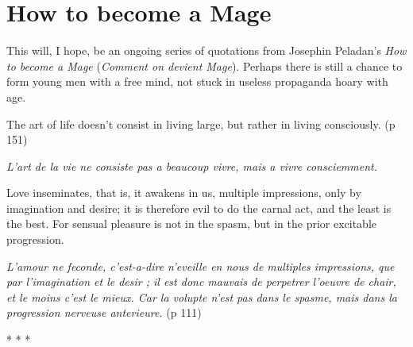 \section{How to become a Mage}

This will, I hope, be an ongoing series of quotations from Josephin Peladan's \textit{How to become a Mage} (\textit{Comment on devient Mage}). Perhaps there is still a chance to form young men with a free mind, not stuck in useless propaganda hoary with age.

\begin{quotex}
The art of life doesn't consist in living large, but rather in living consciously. (p 151)

\textit{L'art de la vie ne consiste pas a beaucoup vivre, mais a vivre consciemment.}
\end{quotex}


\begin{quotex}
Love inseminates, that is, it awakens in us, multiple impressions, only by imagination and desire; it is therefore evil to do the carnal act, and the least is the best. For sensual pleasure is not in the spasm, but in the prior excitable progression.

\textit{L'amour ne feconde, c'est-a-dire n'eveille en nous de multiples impressions, que par l'imagination et le desir ; il est donc mauvais de perpetrer l'oeuvre de chair, et le moins c'est le mieux. Car la volupte n'est pas dans le spasme, mais dans la progression nerveuse anterieure.} (p 111)
\end{quotex}




\begin{center}* * *\end{center}

